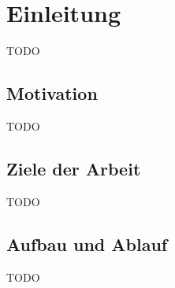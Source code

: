 \chapter{Einleitung}

TODO

\section{Motivation}

TODO

\section{Ziele der Arbeit}

TODO

\section{Aufbau und Ablauf}

TODO